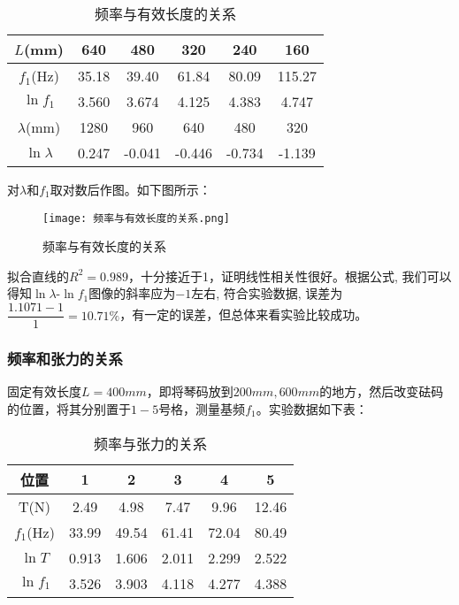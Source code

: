 \documentclass[11pt]{article}
\begin{document}
\begin{table}[H]
    \centering
    \caption{频率与有效长度的关系}
    \begin{tabular}{|c|c|c|c|c|c|}
        \hline
        $L$(mm)&640&480&320&240&160\\
        \hline
        $f_1$(Hz)&35.18  & 39.40  & 61.84  & 80.09  & 115.27  \\
        \hline
        $\ln f_1$&3.560  & 3.674  & 4.125  & 4.383  & 4.747  \\
        \hline
        $\lambda$(mm)&1280&960&640&480&320\\
        \hline
        $\ln \lambda$&0.247  & -0.041  & -0.446  & -0.734  & -1.139  \\
        \hline
    \end{tabular}
\end{table}

对$\lambda$和$f_1$取对数后作图。如下图所示：

\begin{figure}[H]
    \centering
    \texttt{[image: 频率与有效长度的关系.png]}
    \caption{频率与有效长度的关系}
\end{figure}

拟合直线的$R^2 = 0.989$，十分接近于1，证明线性相关性很好。根据公式, 我们可以得知$\ln \lambda$-$\ln f_1$图像的斜率应为$-1$左右, 符合实验数据, 误差为$\dfrac{1.1071-1}{1} = 10.71\%$，有一定的误差，但总体来看实验比较成功。

\subsubsection{频率和张力的关系}

固定有效长度$L = 400mm$，即将琴码放到$200mm,600mm$的地方，然后改变砝码的位置，将其分别置于$1-5$号格，测量基频$f_1$。实验数据如下表：

\begin{table}[H]
    \centering
    \caption{频率与张力的关系}
    \begin{tabular}{|c|c|c|c|c|c|}
        \hline
        位置&1&2&3&4&5\\
        \hline
        T(N)&2.49  & 4.98  & 7.47  & 9.96  & 12.46  \\
        \hline
        $f_1$(Hz)&33.99  & 49.54  & 61.41  & 72.04  & 80.49  \\
        \hline
        $\ln T$&0.913  & 1.606  & 2.011  & 2.299  & 2.522  \\
        \hline
        $\ln f_1$&3.526  & 3.903  & 4.118  & 4.277  & 4.388  \\
        \hline
    \end{tabular}
\end{table}
\end{document}
